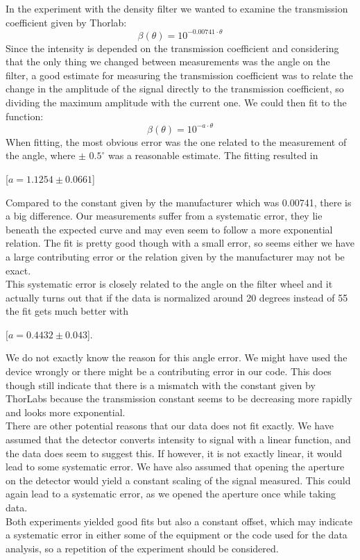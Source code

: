 \documentclass[working, oneside]{inputs/tuftebook}
\begin{document}
In the experiment with the density filter we wanted to examine the transmission coefficient given by  Thorlab:
\[
\beta(\theta)=10^{-0.00741\cdot \theta}
\]
Since the intensity is depended on the transmission coefficient and considering that the only thing we changed between measurements was the angle on the filter, a good estimate for measuring the transmission coefficient was to relate the change in the amplitude of the signal directly to the transmission coefficient, so dividing the maximum amplitude with the current one. We could then fit to the function:
\[
\beta(\theta)=10^{-a\cdot \theta}
\]
When fitting, the most obvious error was the one related to the measurement of the angle, where $\pm$ $0.5^{\circ}$ was a reasonable estimate. The fitting resulted in 
\begin{center}
[$a=1.1254 \pm 0.0661$]
\end{center}
Compared to the constant given by the manufacturer which was 0.00741, there is a big difference. Our measurements suffer from a systematic error, they lie beneath the expected curve and may even seem to follow a more exponential relation. The fit is pretty good though with a small error, so seems either we have a large contributing error or the relation given by the manufacturer may not be exact. \\
This systematic error is closely related to the angle on the filter wheel and it actually turns out that if the data is normalized around 20 degrees instead of 55 the fit gets much better with 
\begin{center}
$[a=0.4432 \pm 0.043$].
\end{center}
 We do not exactly know the reason for this angle error. We might have used the device wrongly or there might be a contributing error in our code. This does though still indicate that there is a mismatch with the constant given by ThorLabs because the transmission constant seems to be decreasing more rapidly and looks more exponential. 
 \\
There are other potential reasons that our data does not fit exactly. We have assumed that the detector converts intensity to signal with a linear function, and the data does seem to suggest this. If however, it is not exactly linear, it would lead to some systematic error. We have also assumed that opening the aperture on the detector would yield a constant scaling of the signal measured. This could again lead to a systematic error, as we opened the aperture once while taking data. 
\\
Both experiments yielded good fits but also a constant offset, which may indicate a systematic error in either some of the equipment or the code used for the data analysis, so a repetition of the experiment should be considered.
\end{document}
